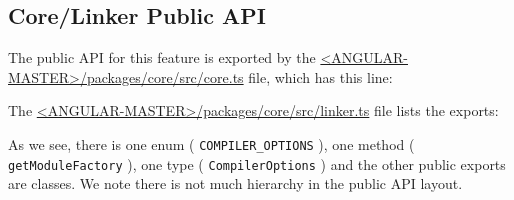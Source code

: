 \subsection{Core/Linker Public API}

The public API for this feature is exported by the
\href{https://github.com/angular/angular/blob/master/packages/core/src/core.ts}
{<ANGULAR-MASTER>/packages/core/src/core.ts}
file, which has this line:



The
\href{https://github.com/angular/angular/blob/master/packages/core/src/linker.ts}
{<ANGULAR-MASTER>/packages/core/src/linker.ts}
file lists the exports:



As we see, there is one enum (
\texttt{COMPILER\_OPTIONS}
), one method (
\texttt{getModuleFactory}
),
one type (
\texttt{CompilerOptions}
) and the other public exports are classes. We note there
is not much hierarchy in the public API layout.
